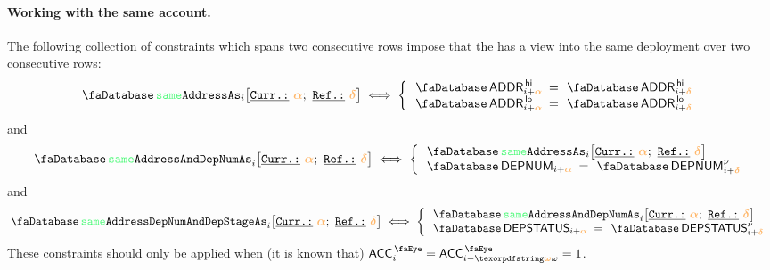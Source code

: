 \paragraph*{Working with the same account.}
The following collection of constraints which spans two consecutive rows impose that the \zkEvm{} has a view into the same deployment over two consecutive rows:
\[
	\accSameAddr  {i}{\reluo}{\reldo}
	\iff
	\left\{ \begin{array}{lcl}
		\accAddress\high_{i + \reluo}	& \!\!\! = \!\!\! & \accAddress\high_{i + \reldo} \\ 
		\accAddress\low _{i + \reluo}	& \!\!\! = \!\!\! & \accAddress\low _{i + \reldo} \\
	\end{array} \right.
\]
and 
\[
	\accSameAddrAndDepNum  {i}{\reluo}{\reldo}
	\iff
	\left\{ \begin{array}{lcl}
		\multicolumn{3}{l}{\accSameAddr  {i}{\reluo}{\reldo}} \\
		\accDeploymentNumber_{i + \reluo} 	& \!\!\! = \!\!\! & \accDeploymentNumber\new_{i + \reldo} \\
	\end{array} \right.
\]
and
\[
	\accSameAddrDepNumAndDepStage  {i}{\reluo}{\reldo}
	\iff
	\left\{ \begin{array}{lcl}
		\multicolumn{3}{l}{\accSameAddrAndDepNum  {i}{\reluo}{\reldo}} \\
		\accDeploymentStatus_{i + \reluo} & \!\!\! = \!\!\! & \accDeploymentStatus\new_{i + \reldo} \\
	\end{array} \right.
\]
\saNote{} These constraints should only be applied when (it is known that) $\peekAccount_{i} = \peekAccount_{i - \relof} = 1$.


